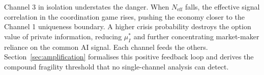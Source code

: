 Channel 3 in isolation understates the danger. When $N_{\text{eff}}$ falls, the effective signal correlation in the coordination game rises, pushing the economy closer to the Channel 1 uniqueness boundary. A higher crisis probability destroys the option value of private information, reducing $\mu_I^*$ and further concentrating market-maker reliance on the common AI signal. Each channel feeds the others. Section~\ref{sec:amplification} formalises this positive feedback loop and derives the compound fragility threshold that no single-channel analysis can detect.
